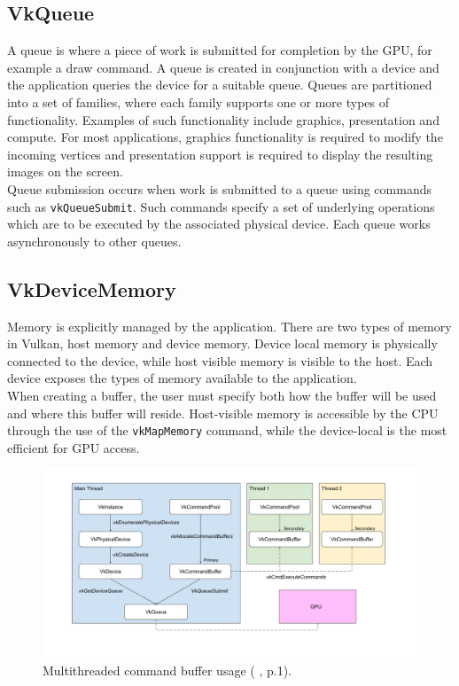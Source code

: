 \documentclass[12pt]{report}
\newcommand{\citediagram}[2]{(\citeauthor{#1} \citeyear{#1}, p.#2)}
\theoremstyle{definition}
\begin{document}
      \subsection{VkQueue}

        A queue is where a piece of work is submitted for completion by the GPU,
        for example a draw command. A queue is created in conjunction with a
        device and the application queries the device for a suitable queue.
        Queues are partitioned into a set of families, where each family
        supports one or more types of functionality. Examples of such
        functionality include graphics, presentation and compute. For most
        applications, graphics functionality is required to modify the
        incoming vertices and presentation support is required to display
        the resulting images on the screen. \\

        Queue submission occurs when work is submitted to a queue using commands
        such as \texttt{vkQueueSubmit}. Such commands specify a set of underlying
        operations which are to be executed by the associated physical
        device. Each queue works asynchronously to other queues.

      \subsection{VkDeviceMemory}

        Memory is explicitly managed by the application. There are two types of
        memory in Vulkan, host memory and device memory. Device local memory is
        physically connected to the device, while host visible memory is
        visible to the host. Each device exposes the types of memory available
        to the application. \\

        When creating a buffer, the user must specify both how the buffer will
        be used and where this buffer will reside. Host-visible memory is
        accessible by the CPU through the use of the \texttt{vkMapMemory} command, while
        the device-local is the most efficient for GPU access.

      \begin{figure}[h]
        \centering
        \includegraphics[width=\textwidth]{images/pi_hierarchy.png}
        \caption{Multithreaded command buffer usage \citediagram{personalinquiry}{1}.}
        \label{fig:command_buffer}  
      \end{figure}
\end{document}
